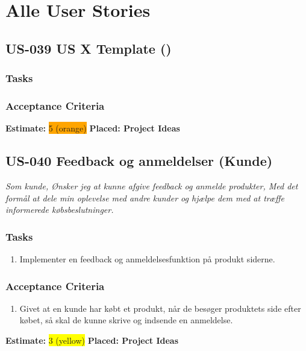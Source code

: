 \section{Alle User Stories}
\label{sec:all-user-stories}

\subsection{US-039 US X Template ()}
\label{sec:US-039}
\textit{}
\subsubsection*{\textbf{Tasks}}
\begin{enumerate}
\end{enumerate}
\subsubsection*{\textbf{Acceptance Criteria}}
\begin{enumerate}
\end{enumerate}
\textbf{Estimate:} \colorbox{orange}{5 (orange)}
\textbf{Placed: Project Ideas}
\par\noindent\dotfill

\subsection{US-040 Feedback og anmeldelser (Kunde)}
\label{sec:US-040}
\textit{Som kunde, Ønsker jeg at kunne afgive feedback og anmelde produkter, Med det formål at dele min oplevelse med andre kunder og hjælpe dem med at træffe informerede købsbeslutninger.}
\subsubsection*{\textbf{Tasks}}
\begin{enumerate}
  \item Implementer en feedback og anmeldelsesfunktion på produkt siderne.
\end{enumerate}
\subsubsection*{\textbf{Acceptance Criteria}}
\begin{enumerate}
  \item Givet at en kunde har købt et produkt, når de besøger produktets side efter købet, så skal de kunne skrive og indsende en anmeldelse.
\end{enumerate}
\textbf{Estimate:} \colorbox{yellow}{3 (yellow)}
\textbf{Placed: Project Ideas}
\par\noindent\dotfill

